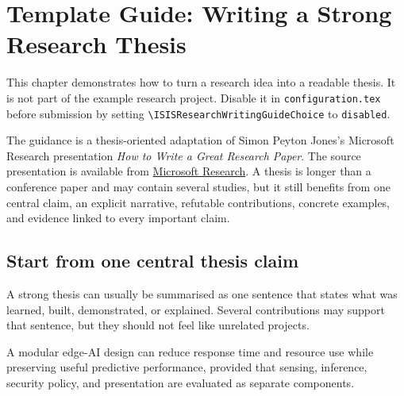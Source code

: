 
\chapter{Template Guide: Writing a Strong Research Thesis}\label{ch:writing-guide-en}

\begin{keypoint}
This chapter demonstrates how to turn a research idea into a readable thesis.
It is not part of the example research project. Disable it in
\texttt{configuration.tex} before submission by setting
\texttt{\textbackslash ISISResearchWritingGuideChoice} to \texttt{disabled}.
\end{keypoint}

The guidance is a thesis-oriented adaptation of Simon Peyton Jones's Microsoft
Research presentation \emph{How to Write a Great Research Paper}. The source
presentation is available from
\href{https://www.microsoft.com/en-us/research/wp-content/uploads/2016/07/How-to-write-a-great-research-paper.pdf}{Microsoft Research}.
A thesis is longer than a conference paper and may contain several studies, but
it still benefits from one central claim, an explicit narrative, refutable
contributions, concrete examples, and evidence linked to every important claim.

\section{Start from one central thesis claim}
A strong thesis can usually be summarised as one sentence that states what was
learned, built, demonstrated, or explained. Several contributions may support
that sentence, but they should not feel like unrelated projects.

\begin{researchquestion}
A modular edge-AI design can reduce response time and resource use while
preserving useful predictive performance, provided that sensing, inference,
security policy, and presentation are evaluated as separate components.
\end{researchquestion}

